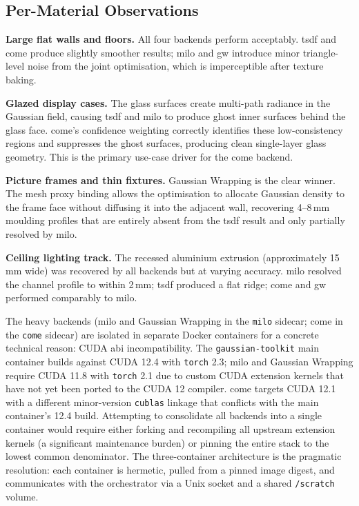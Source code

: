 \subsection*{Per-Material Observations}

\textbf{Large flat walls and floors.} All four backends perform acceptably. \acrshort{tsdf} and \acrshort{come} produce slightly smoother results; \acrshort{milo} and \acrshort{gw} introduce minor triangle-level noise from the joint optimisation, which is imperceptible after texture baking.

\textbf{Glazed display cases.} The glass surfaces create multi-path radiance in the Gaussian field, causing \acrshort{tsdf} and \acrshort{milo} to produce ghost inner surfaces behind the glass face. \acrshort{come}'s confidence weighting correctly identifies these low-consistency regions and suppresses the ghost surfaces, producing clean single-layer glass geometry. This is the primary use-case driver for the \acrshort{come} backend.

\textbf{Picture frames and thin fixtures.} Gaussian Wrapping is the clear winner. The mesh proxy binding allows the optimisation to allocate Gaussian density to the frame face without diffusing it into the adjacent wall, recovering 4--8\,mm moulding profiles that are entirely absent from the \acrshort{tsdf} result and only partially resolved by \acrshort{milo}.

\textbf{Ceiling lighting track.} The recessed aluminium extrusion (approximately 15\,mm wide) was recovered by all backends but at varying accuracy. \acrshort{milo} resolved the channel profile to within 2\,mm; \acrshort{tsdf} produced a flat ridge; \acrshort{come} and \acrshort{gw} performed comparably to \acrshort{milo}.

\begin{technote}
  The heavy backends (\acrshort{milo} and Gaussian Wrapping in the \texttt{milo} sidecar; \acrshort{come} in the \texttt{come} sidecar) are isolated in separate Docker containers for a concrete technical reason: CUDA \acrshort{abi} incompatibility. The \texttt{gaussian-toolkit} main container builds against CUDA 12.4 with \texttt{torch} 2.3; \acrshort{milo} and Gaussian Wrapping require CUDA 11.8 with \texttt{torch} 2.1 due to custom CUDA extension kernels that have not yet been ported to the CUDA 12 compiler. \acrshort{come} targets CUDA 12.1 with a different minor-version \texttt{cublas} linkage that conflicts with the main container's 12.4 build. Attempting to consolidate all backends into a single container would require either forking and recompiling all upstream extension kernels (a significant maintenance burden) or pinning the entire stack to the lowest common denominator. The three-container architecture is the pragmatic resolution: each container is hermetic, pulled from a pinned image digest, and communicates with the orchestrator via a Unix socket and a shared \texttt{/scratch} volume.
\end{technote}

